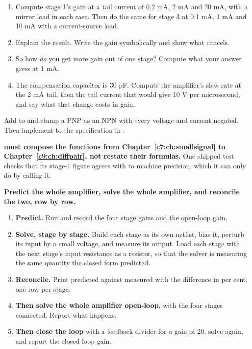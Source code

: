 \label{c10:ex:6}
\begin{enumerate}
  \item Compute stage 1's gain at a tail current of 0.2 mA, 2 mA and 20 mA, with a mirror load in each case. Then do the same for stage 3 at 0.1 mA, 1 mA and 10 mA with a current-source load.
  \item Explain the result. Write the gain symbolically and show what cancels.
  \item So how \emph{do} you get more gain out of one stage? Compute what your answer gives at 1 mA.
  \item The compensation capacitor is 30 pF. Compute the amplifier's slew rate at the 2 mA tail, then the tail current that would give 10 V per microsecond, and say what that change costs in gain.
\end{enumerate}

\label{c10:ex:7}
Add  to  and stamp a PNP as an NPN with every voltage and current negated. Then implement  to the specification in .

\textbf{ must compose the functions from Chapter~\ref{c7:ch:smallsignal} to Chapter~\ref{c9:ch:diffpair}, not restate their formulas.} One shipped test checks that its stage-1 figure agrees with  to machine precision, which it can only do by calling it.

\label{c10:ex:8}
\textbf{Predict the whole amplifier, solve the whole amplifier, and reconcile the two, row by row.}

\begin{enumerate}
  \item \textbf{Predict.} Run  and record the four stage gains and the open-loop gain.
  \item \textbf{Solve, stage by stage.} Build each stage as its own netlist, bias it, perturb its input by a small voltage, and measure its output. Load each stage with the next stage's input resistance as a resistor, so that the solver is measuring the same quantity the closed form predicted.
  \item \textbf{Reconcile.} Print predicted against measured with the difference in per cent, one row per stage.
  \item \textbf{Then solve the whole amplifier open-loop}, with the four stages connected. Report what happens.
  \item \textbf{Then close the loop} with a feedback divider for a gain of 20, solve again, and report the closed-loop gain.
\end{enumerate}

